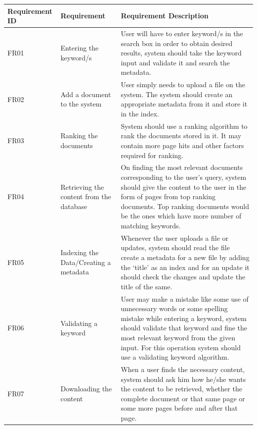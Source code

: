 \documentclass[11pt,letterpaper]{article}
\begin{document}
{\tabulinesep=2mm
   \begin{longtabu} { |p{5cm} | p{5cm} | p{5cm }|}
       \hline

\textbf{Requirement ID} & \textbf{ Requirement} & \textbf{Requirement Description}\\ \hline
	
FR01 &
Entering the keyword/s &
User will have to enter keyword/s in the search box in order to obtain desired results, system should take 	 the keyword input and validate it and search the metadata.\\ \hline

FR02 & Add a document to the system & User simply needs to upload a file on the system. The system should create an appropriate metadata from it and store it in the index.\\ \hline

FR03 & Ranking the documents & System should use a ranking algorithm to rank the documents stored in it. It may contain more page hits and other factors required for ranking.\\ \hline

FR04 & Retrieving  the content from the database & On finding the most relevant documents corresponding to the user’s query, system should give the content to the user in the form of pages from top ranking documents. Top ranking documents would be the ones which have more number of matching keywords.\\ \hline

FR05 & 
Indexing the Data/Creating a metadata & 
Whenever the user uploads a file or updates, system should read the file create a metadata for a new file by adding the ‘title’ as an index and for an update it should check the changes and update the title of the same.\\ \hline

FR06 &
Validating a keyword & 
User may make a mistake like some use of unnecessary words or some spelling mistake while entering a keyword, system should validate that keyword and fine the most relevant keyword from the given input. For this operation system should use a validating keyword algorithm.\\ \hline

FR07 & 
Downloading the content & 
When a user finds the necessary content, system should ask him how he/she wants the content to be retrieved, whether the complete document or that same page or some more pages before and after that page.\\ \hline
      
   \end{longtabu}
}
\end{document}
